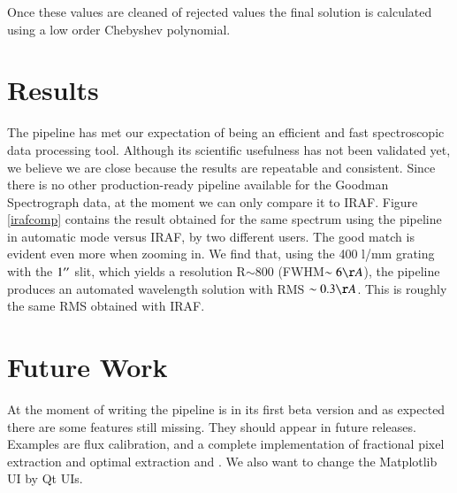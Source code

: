 \documentclass[11pt,twoside]{article}
\begin{document}
Once these values are cleaned of rejected values the final solution
is calculated using a low order Chebyshev polynomial.



\section{Results}
The pipeline has met our expectation of being an efficient and fast
spectroscopic data processing tool. Although its scientific usefulness has not
been validated yet, we believe we are close because the results are
repeatable and consistent. Since there is no other production-ready pipeline
available for the Goodman Spectrograph data, at the moment we can only compare it to
IRAF. Figure \ref{irafcomp} contains the result obtained for the same spectrum using
the pipeline in automatic mode versus IRAF, by two different users. The good
match is evident even more when zooming in. 
We find that, using the 400 l/mm grating with the $1\hbox{$^{\prime\prime}$}$ slit, which yields
a resolution R$\sim 800$ (FWHM$\sim 6 \AA$), the pipeline produces an automated 
wavelength solution with RMS $\sim 0.3 \AA$. This is roughly the same RMS obtained
with IRAF.




\section{Future Work}

At the moment of writing the pipeline is in its first beta version and as
expected there are some features still missing. They should appear in future
releases. Examples are flux calibration, and a complete implementation of fractional pixel
extraction and optimal extraction \citep{1989PASP..101.1032M} and \citep{1986PASP...98..609H}.
We also want to change the Matplotlib UI by Qt UIs.
\end{document}
